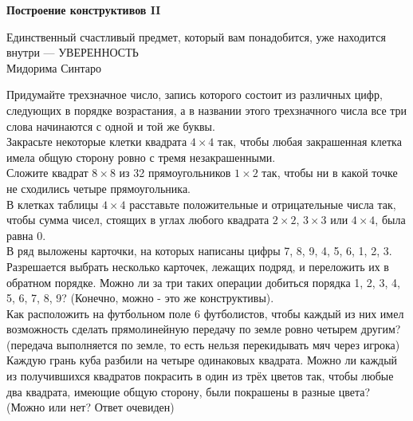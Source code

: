 \centerline{\bf \Huge Построение конструктивов II}


\begin{flushright}
        \scriptsize{Единственный счастливый предмет, который вам понадобится, уже находится внутри — УВЕРЕННОСТЬ\\ Мидорима Синтаро}
\end{flushright}

 Придумайте трехзначное число, запись которого состоит из различных цифр, следующих в порядке возрастания, а в названии этого трехзначного числа все три слова начинаются с одной и той же буквы.\\

 Закрасьте некоторые клетки квадрата $4\times4$ так, чтобы любая закрашенная клетка имела общую сторону ровно с тремя незакрашенными.\\

 Сложите квадрат $8\times8$ из 32 прямоугольников $1\times2$  так, чтобы ни в какой точке не сходились четыре прямоугольника.\\

 В клетках таблицы $4\times4$ расставьте положительные и отрицательные числа так, чтобы сумма чисел, стоящих в углах любого квадрата $2\times2$, $3\times3$ или $4\times4$, была равна 0.\\

 В ряд выложены карточки, на которых написаны цифры 7, 8, 9, 4, 5, 6, 1, 2, 3. Разрешается выбрать несколько карточек, лежащих подряд, и переложить их в обратном порядке. Можно ли за три таких операции добиться порядка 1, 2, 3, 4, 5, 6, 7, 8, 9? (Конечно, можно - это же конструктивы).\\


 Как расположить на футбольном поле 6 футболистов, чтобы каждый из них имел возможность сделать прямолинейную передачу по земле ровно четырем другим? (передача выполняется по земле, то есть нельзя перекидывать мяч через игрока)\\

 Каждую грань куба разбили на четыре одинаковых квадрата. Можно ли каждый из получившихся квадратов покрасить в один из трёх цветов так, чтобы любые два квадрата, имеющие общую сторону, были покрашены в разные цвета? (Можно или нет? Ответ очевиден)